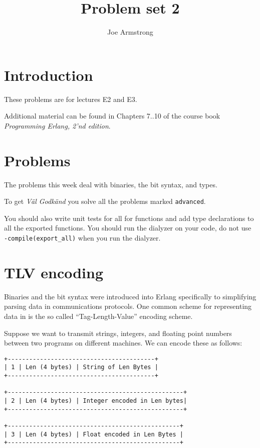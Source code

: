 \documentclass[12pt]{hitec}
\title{Problem set 2}
\author{Joe Armstrong}
\begin{document}
\maketitle

\tableofcontents

\section{Introduction}
These problems are for lectures E2 and E3.

Additional material can be found in Chapters 7..10 of the course book
{\sl Programming Erlang, 2'nd edition}.

\section{Problems}

The problems this week deal with binaries, the bit syntax, and types.

To get {\sl V\"{a}l Godk\"{a}nd} you solve all the problems marked
\verb+advanced+.

You should also write unit tests for all for functions and add type
declarations to all the exported functions. You should run the dialyzer
on your code, do not use \verb+-compile(export_all)+ when you run the dialyzer.

\section{TLV encoding}

Binaries and the bit syntax were introduced into Erlang specifically to
simplifying parsing data in communications protocols. 
One common scheme for representing data in
is the so called ``Tag-Length-Value'' encoding scheme.

Suppose we want to transmit strings, integers, and floating point numbers
between two programs on different machines. We can encode these as follows:

\begin{verbatim}
+-----------------------------------------+
| 1 | Len (4 bytes) | String of Len Bytes |
+-----------------------------------------+

+-------------------------------------------------+
| 2 | Len (4 bytes) | Integer encoded in Len bytes|
+-------------------------------------------------+

+------------------------------------------------+
| 3 | Len (4 bytes) | Float encoded in Len Bytes |
+------------------------------------------------+
\end{verbatim}
\end{document}
